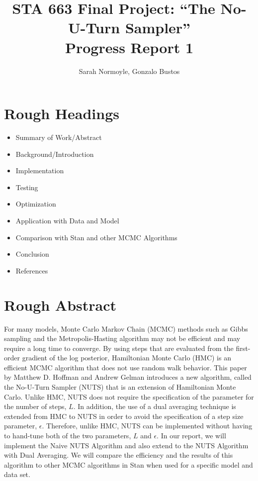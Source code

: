\documentclass{article}
\begin{document}
\title{STA 663 Final Project: ``The No-U-Turn Sampler'' \\ Progress Report 1 \\ 
}
\author{Sarah Normoyle, Gonzalo Bustos}

\maketitle 

\section{Rough Headings}
\begin{itemize}
	\item Summary of Work/Abstract
	\item Background/Introduction
	\item Implementation
	\item Testing
	\item Optimization
	\item Application with Data and Model
	\item Comparison with Stan and other MCMC Algorithms
	\item Conclusion
	\item References

\end{itemize}

\section{Rough Abstract}
For many models, Monte Carlo Markov Chain (MCMC) methods such as Gibbs sampling and the Metropolis-Hasting algorithm may not be efficient and may require a long time to converge. By using steps that are evaluated from the first-order gradient of the log posterior, Hamiltonian Monte Carlo (HMC) is an efficient MCMC algorithm that does not use random walk behavior. This paper by Matthew D. Hoffman and Andrew Gelman introduces a new algorithm, called the No-U-Turn Sampler (NUTS) that is an extension of Hamiltonian Monte Carlo. Unlike HMC, NUTS does not require the specification of the parameter for the number of steps, $L$. In addition, the use of a dual averaging technique is extended from HMC to NUTS in order to avoid the specification of a step size parameter, $\epsilon$. Therefore, unlike HMC, NUTS can be implemented without having to hand-tune both of the two parameters, $L$ and $\epsilon$. In our report, we will implement the Naive NUTS Algorithm and also extend to the NUTS Algorithm with Dual Averaging. We will compare the efficiency and the results of this algorithm to other MCMC algorithms in Stan when used for a specific model and data set.
\end{document}
